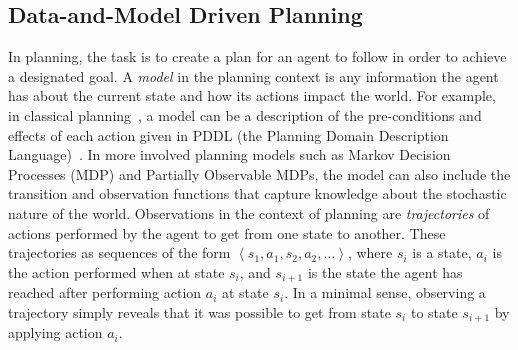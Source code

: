 \documentclass[12pt]{article}
\newcommand{\tuple}[1]{\ensuremath{\left \langle #1 \right \rangle }}
\begin{document}




\subsection{Data-and-Model Driven Planning}

In planning, the task is to create a plan for an agent to follow in order to achieve a designated goal. A {\em model} in the planning context is any information the agent has about the current state and how its actions impact the world. For example, in classical planning~\cite{fikes1971strips}, a model can be a description of the pre-conditions and effects of each action given in PDDL (the Planning Domain Description Language)~\cite{mcdermott1998pddl}. In more involved planning models such as Markov Decision Processes (MDP) and Partially Observable MDPs, the model can also include the transition and observation functions that capture knowledge about the stochastic nature of the world. 
Observations in the context of planning are {\em trajectories} of actions performed by the agent to get from one state to another. These trajectories as sequences of the form $\tuple{ s_1, a_1, s_2, a_2, \ldots}$, where $s_i$ is a state, $a_i$ is the action performed when at state $s_i$, and $s_{i+1}$ is the state the agent has reached after performing action $a_i$ at state $s_i$. In a minimal sense, observing a trajectory simply reveals that it was possible to get from state $s_i$ to state $s_{i+1}$ by applying action $a_i$. %
\end{document}

